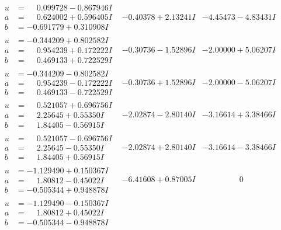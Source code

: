 \documentclass[1p]{elsarticle_modified}
\theoremstyle{definition}
\begin{document}
$$\begin{array}{c|c|c}
\begin{aligned}
u &= \phantom{-}0.099728 - 0.867946 I \\
a &= \phantom{-}0.624002 + 0.596405 I \\
b &= -0.691779 + 0.310908 I\end{aligned}
 & -0.40378 + 2.13241 I & -4.45473 - 4.83431 I \\ \hline\begin{aligned}
u &= -0.344209 + 0.802582 I \\
a &= \phantom{-}0.954239 + 0.172222 I \\
b &= \phantom{-}0.469133 + 0.722529 I\end{aligned}
 & -0.30736 - 1.52896 I & -2.00000 + 5.06207 I \\ \hline\begin{aligned}
u &= -0.344209 - 0.802582 I \\
a &= \phantom{-}0.954239 - 0.172222 I \\
b &= \phantom{-}0.469133 - 0.722529 I\end{aligned}
 & -0.30736 + 1.52896 I & -2.00000 - 5.06207 I \\ \hline\begin{aligned}
u &= \phantom{-}0.521057 + 0.696756 I \\
a &= \phantom{-}2.25645 + 0.55350 I \\
b &= \phantom{-}1.84405 - 0.56915 I\end{aligned}
 & -2.02874 - 2.80140 I & -3.16614 + 3.38466 I \\ \hline\begin{aligned}
u &= \phantom{-}0.521057 - 0.696756 I \\
a &= \phantom{-}2.25645 - 0.55350 I \\
b &= \phantom{-}1.84405 + 0.56915 I\end{aligned}
 & -2.02874 + 2.80140 I & -3.16614 - 3.38466 I \\ \hline\begin{aligned}
u &= -1.129490 + 0.150367 I \\
a &= \phantom{-}1.80812 - 0.45022 I \\
b &= -0.505344 + 0.948878 I\end{aligned}
 & -6.41608 + 0.87005 I & \phantom{-0.000000 } 0 \\ \hline\begin{aligned}
u &= -1.129490 - 0.150367 I \\
a &= \phantom{-}1.80812 + 0.45022 I \\
b &= -0.505344 - 0.948878 I\end{aligned}

\end{array}$$
\end{document}
